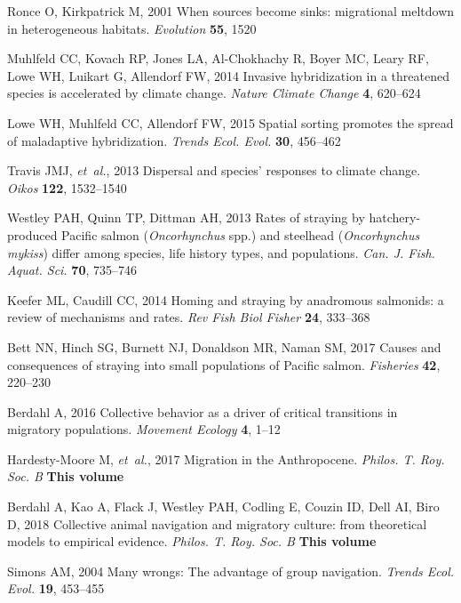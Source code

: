 \documentclass{revtex4}
\begin{document}
\begin{thebibliography}{10}
Ronce O, Kirkpatrick M, 2001 {When sources become sinks: migrational meltdown
  in heterogeneous habitats}.
\newblock \emph{Evolution} \textbf{55}, 1520

Muhlfeld CC, Kovach RP, Jones LA, Al-Chokhachy R, Boyer MC, Leary RF, Lowe WH,
  Luikart G, Allendorf FW, 2014 {Invasive hybridization in a threatened species
  is accelerated by climate change}.
\newblock \emph{Nature Climate Change} \textbf{4}, 620--624

Lowe WH, Muhlfeld CC, Allendorf FW, 2015 {Spatial sorting promotes the spread
  of maladaptive hybridization}.
\newblock \emph{Trends Ecol. Evol.} \textbf{30}, 456--462

Travis JMJ, \emph{et~al.}, 2013 {Dispersal and species{\textquoteright}
  responses to climate change}.
\newblock \emph{Oikos} \textbf{122}, 1532--1540

Westley PAH, Quinn TP, Dittman AH, 2013 {Rates of straying by hatchery-produced
  Pacific salmon (\emph{Oncorhynchus} spp.) and steelhead (\emph{Oncorhynchus
  mykiss}) differ among species, life history types, and populations}.
\newblock \emph{Can. J. Fish. Aquat. Sci.} \textbf{70}, 735--746

Keefer ML, Caudill CC, 2014 {Homing and straying by anadromous salmonids: a
  review of mechanisms and rates}.
\newblock \emph{Rev Fish Biol Fisher} \textbf{24}, 333--368

Bett NN, Hinch SG, Burnett NJ, Donaldson MR, Naman SM, 2017 {Causes and
  consequences of straying into small populations of Pacific salmon}.
\newblock \emph{Fisheries} \textbf{42}, 220--230

Berdahl A, 2016 {Collective behavior as a driver of critical transitions in
  migratory populations}.
\newblock \emph{Movement Ecology} \textbf{4}, 1--12

Hardesty-Moore M, \emph{et~al.}, 2017 {Migration in the Anthropocene}.
\newblock \emph{Philos. T. Roy. Soc. B} \textbf{This volume}

Berdahl A, Kao A, Flack J, Westley PAH, Codling E, Couzin ID, Dell AI, Biro D,
  2018 {Collective animal navigation and migratory culture: from theoretical
  models to empirical evidence.}
\newblock \emph{Philos. T. Roy. Soc. B} \textbf{This volume}

Simons AM, 2004 {Many wrongs: The advantage of group navigation}.
\newblock \emph{Trends Ecol. Evol.} \textbf{19}, 453--455


\end{thebibliography}
\end{document}
